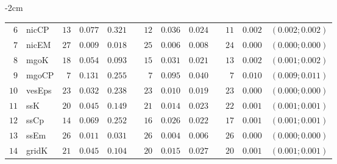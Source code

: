 \begin{table*}[!htbp]
\begin{adjustwidth*}{}{-2cm}
\begin{tabular}{@{}rlrrrrrrrrrcc@{}}
\footnotesize{$6 $} & \footnotesize{nicCP    } & \footnotesize{$13$} & \footnotesize{$0.077$} & \footnotesize{$0.321$} && \footnotesize{$12$} & \footnotesize{$0.036$} & \footnotesize{$0.024$} && \footnotesize{$11$} & \footnotesize{$0.002$} & \footnotesize{$(0.002;0.002)$} \\
\footnotesize{$7 $} & \footnotesize{nicEM    } & \footnotesize{$27$} & \footnotesize{$0.009$} & \footnotesize{$0.018$} && \footnotesize{$25$} & \footnotesize{$0.006$} & \footnotesize{$0.008$} && \footnotesize{$24$} & \footnotesize{$0.000$} & \footnotesize{$(0.000;0.000)$} \\
\footnotesize{$8 $} & \footnotesize{mgoK     } & \footnotesize{$18$} & \footnotesize{$0.054$} & \footnotesize{$0.093$} && \footnotesize{$15$} & \footnotesize{$0.031$} & \footnotesize{$0.021$} && \footnotesize{$13$} & \footnotesize{$0.002$} & \footnotesize{$(0.001;0.002)$} \\
\footnotesize{$9 $} & \footnotesize{mgoCP    } & \footnotesize{$7 $} & \footnotesize{$0.131$} & \footnotesize{$0.255$} && \footnotesize{$7 $} & \footnotesize{$0.095$} & \footnotesize{$0.040$} && \footnotesize{$7 $} & \footnotesize{$0.010$} & \footnotesize{$(0.009;0.011)$} \\
\footnotesize{$10$} & \footnotesize{vesEps   } & \footnotesize{$23$} & \footnotesize{$0.032$} & \footnotesize{$0.238$} && \footnotesize{$23$} & \footnotesize{$0.010$} & \footnotesize{$0.019$} && \footnotesize{$23$} & \footnotesize{$0.000$} & \footnotesize{$(0.000;0.000)$} \\
\footnotesize{$11$} & \footnotesize{ssK      } & \footnotesize{$20$} & \footnotesize{$0.045$} & \footnotesize{$0.149$} && \footnotesize{$21$} & \footnotesize{$0.014$} & \footnotesize{$0.023$} && \footnotesize{$22$} & \footnotesize{$0.001$} & \footnotesize{$(0.001;0.001)$} \\
\footnotesize{$12$} & \footnotesize{ssCp     } & \footnotesize{$14$} & \footnotesize{$0.069$} & \footnotesize{$0.252$} && \footnotesize{$16$} & \footnotesize{$0.026$} & \footnotesize{$0.022$} && \footnotesize{$17$} & \footnotesize{$0.001$} & \footnotesize{$(0.001;0.001)$} \\
\footnotesize{$13$} & \footnotesize{ssEm     } & \footnotesize{$26$} & \footnotesize{$0.011$} & \footnotesize{$0.031$} && \footnotesize{$26$} & \footnotesize{$0.004$} & \footnotesize{$0.006$} && \footnotesize{$26$} & \footnotesize{$0.000$} & \footnotesize{$(0.000;0.000)$} \\
\footnotesize{$14$} & \footnotesize{gridK    } & \footnotesize{$21$} & \footnotesize{$0.045$} & \footnotesize{$0.104$} && \footnotesize{$20$} & \footnotesize{$0.015$} & \footnotesize{$0.027$} && \footnotesize{$20$} & \footnotesize{$0.001$} & \footnotesize{$(0.001;0.001)$} \\

\end{tabular}
\end{adjustwidth*}
\end{table*}

